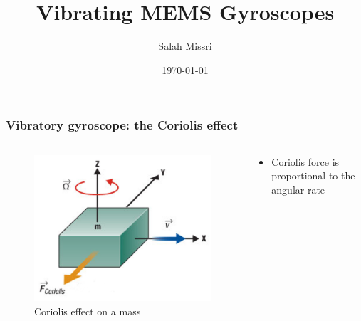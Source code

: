 \documentclass[10pt]{beamer}
\title{Vibrating {\rmfamily\textsc{MEMS}} Gyroscopes}
\date{\today}
\author{Salah Missri}
\institute{EPFL}
\begin{document}
\maketitle



\begin{frame}
\frametitle{Vibratory gyroscope: the Coriolis effect}
\begin{columns}
    \begin{column}{.48\textwidth}
        \begin{figure}
            \centering
            \includegraphics[width=1.\linewidth]{coriolis1.png}
            \caption{Coriolis effect on a mass\cite{MEMSblog}}
            \label{fig:coriolis}
        \end{figure}
    \end{column}
    \hfill
    \begin{column}{.60\textwidth}
        \begin{itemize}
            \item Coriolis force is proportional to the angular rate

\end{itemize}
\end{column}
\end{columns}
\end{frame}
\end{document}
